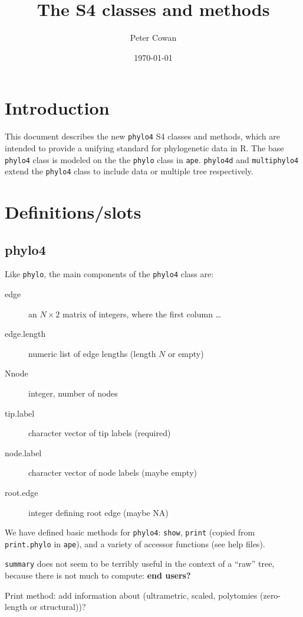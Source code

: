 \documentclass{article}
\title{The \code{phylo4} S4 classes and methods}
\author{Peter Cowan}
\date{\today}
\newcommand{\code}[1]{{{\tt #1}}}
\begin{document}
\maketitle
\tableofcontents

\section{Introduction}

This document describes the new \code{phylo4} S4 classes and methods, which are intended to provide a unifying standard for phylogenetic data in R.  The base \code{phylo4} class is modeled on the the \code{phylo} class in \code{ape}.  \code{phylo4d} and \code{multiphylo4} extend the \code{phylo4} class to include data or multiple tree respectively.

\section{Definitions/slots}

\subsection{phylo4}
Like \code{phylo}, the main components of
the \code{phylo4} class are:
\begin{description}
\item[edge]{an $N \times 2$ matrix of integers,
  where the first column \ldots}
\item[edge.length]{numeric list of edge lengths
(length $N$ or empty)}
\item[Nnode]{integer, number of nodes}
\item[tip.label]{character vector of tip labels (required)}
\item[node.label]{character vector of node labels (maybe empty)}
\item[root.edge]{integer defining root edge (maybe NA)}
\end{description}

We have defined basic methods for \code{phylo4}:
\code{show}, \code{print} (copied from \code{print.phylo} in
\code{ape}), and a variety of accessor functions (see help files).

\code{summary} does not seem to be terribly useful in the
context of a ``raw'' tree, because there is not much to
compute: \textbf{end users?}

Print method: add information about
(ultrametric, scaled, polytomies (zero-length or structural))?
\end{document}
